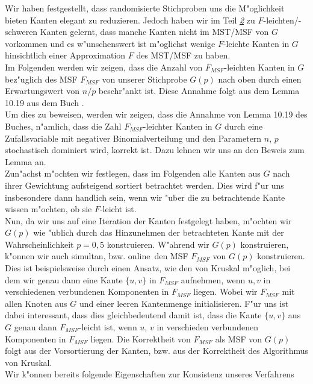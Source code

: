 Wir haben festgestellt, dass randomisierte Stichproben uns die M"oglichkeit 
    bieten Kanten elegant zu reduzieren.
    Jedoch haben wir im Teil \hyperref[sec:fEdg]{\textit{2}} zu $F$-leichten/-schweren Kanten gelernt, dass
    manche Kanten nicht im MST/MSF von $G$ vorkommen und es w"unschenswert
    ist m"oglichst wenige $F$-leichte Kanten in $G$ hinsichtlich einer 
    Approximation $F$ des MST/MSF zu haben.\\
Im Folgenden werden wir zeigen, dass die Anzahl von $F_{MSF}$-leichten Kanten in $G$ 
    bez"uglich des MSF $F_{MSF}$ von unserer Stichprobe $G(p)$ 
    nach oben durch einen Erwartungswert von $n/p$ beschr"ankt ist. 
    Diese Annahme folgt aus dem Lemma 10.19 aus dem Buch \cite{randAlg}.\\
Um dies zu beweisen, werden wir zeigen, dass die Annahme von Lemma 10.19 des
    Buches, n"amlich, dass die Zahl $F_{MSF}$-leichter Kanten in $G$ durch
    eine Zufallsvariable mit negativer Binomialverteilung und den Parametern
    $n$, $p$ stochastisch dominiert wird, korrekt ist.
    Dazu lehnen wir uns an den Beweis zum Lemma an.\\
Zun"achst m"ochten wir festlegen, dass im Folgenden alle Kanten aus $G$ nach 
    ihrer Gewichtung aufsteigend sortiert betrachtet werden.
    Dies wird f"ur uns insbesondere dann handlich sein, wenn wir "uber die zu 
    betrachtende Kante wissen m"ochten, ob sie $F$-leicht ist.\\
Nun, da wir uns auf eine Iteration der Kanten festgelegt haben, m"ochten wir 
    $G(p)$ wie "ublich durch das Hinzunehmen der betrachteten Kante mit
    der Wahrscheinlichkeit $p=0,5$ konstruieren.
    W"ahrend wir $G(p)$ konstruieren, k"onnen wir auch simultan, bzw. 
    \glqq online\grqq\ den MSF $F_{MSF}$ von $G(p)$ konstruieren.
    Dies ist beispielsweise durch einen Ansatz, wie den von Kruskal m"oglich, bei
    dem wir genau dann eine Kante $\{u,v\}$ in $F_{MSF}$ aufnehmen, wenn $u,v$
    in verschiedenen verbundenen Komponenten in $F_{MSF}$ liegen. 
    Wobei wir 
    $F_{MSF}$ mit allen Knoten aus $G$ und einer leeren Kantenmenge 
    initialisieren.
    F"ur uns ist dabei interessant, dass dies gleichbedeutend damit ist, dass die Kante 
    $\{u,v\}$
    aus $G$ genau dann $F_{MSF}$-leicht ist, wenn $u$, $v$ in verschieden 
    verbundenen Komponenten in $F_{MSF}$ liegen.
    Die Korrektheit von $F_{MSF}$ als MSF von $G(p)$ folgt aus der Vorsortierung der Kanten,
    bzw. aus der Korrektheit des Algorithmus von Kruskal.\\
Wir k"onnen bereits folgende Eigenschaften zur Konsistenz unseres Verfahrens
